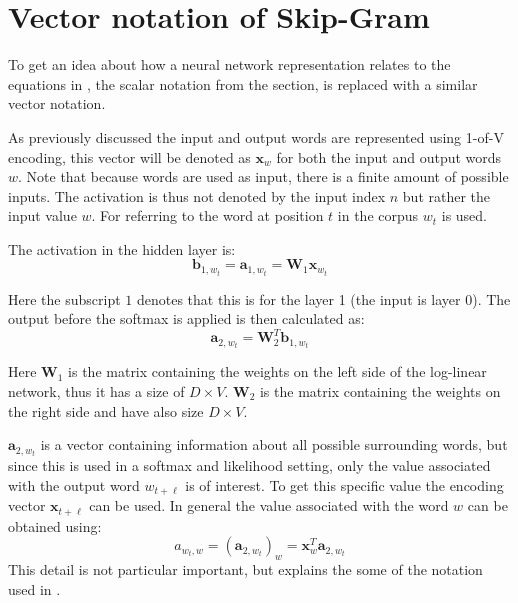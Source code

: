 \chapter{Vector notation of Skip-Gram}
\label{appendix:skipgram}

To get an idea about how a neural network representation relates to the equations in \cite{word2vec-details}, the scalar notation from the  section, is replaced with a similar vector notation.

As previously discussed the input and output words are represented using 1-of-V encoding, this vector will be denoted as $\mathbf{x}_w$ for both the input and output words $w$. Note that because words are used as input, there is a finite amount of possible inputs. The activation is thus not denoted by the input index $n$ but rather the input value $w$. For referring to the word at position $t$ in the corpus $w_t$ is used.

The activation in the hidden layer is:
\begin{equation}
\mathbf{b}_{1,w_t} = \mathbf{a}_{1,w_t} = \mathbf{W}_{1} \mathbf{x}_{w_t}
\end{equation}

Here the subscript $1$ denotes that this is for the layer 1 (the input is layer 0). The output before the softmax is applied is then calculated as:
\begin{equation}
\mathbf{a}_{2,w_t} = \mathbf{W}_2^T \mathbf{b}_{1,w_t}
\end{equation}

Here $\mathbf{W}_1$ is the matrix containing the weights on the left side of the log-linear network, thus it has a size of $D \times V$. $\mathbf{W}_2$ is the matrix containing the weights on the right side and have also size $D \times V$.

$\mathbf{a}_{2,w_t}$ is a vector containing information about all possible surrounding words, but since this is used in a softmax and likelihood setting, only the value associated with the output word $w_{t + \ell}$ is of interest. To get this specific value the encoding vector $\mathbf{x}_{t + \ell}$ can be used. In general the value associated with the word $w$ can be obtained using:
\begin{equation}
a_{w_t,w} = \left(\mathbf{a}_{2,w_t}\right)_w = \mathbf{x}_{w}^T \mathbf{a}_{2,w_t}
\end{equation}
This detail is not particular important, but explains the some of the notation used in \cite{word2vec-details}.

